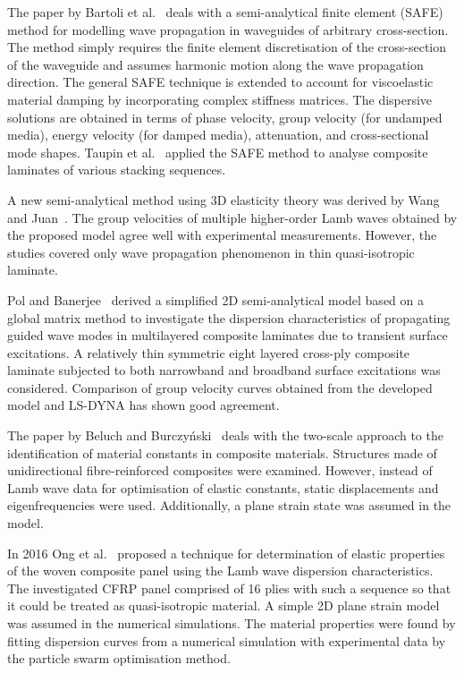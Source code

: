 \documentclass[preprint,12pt]{elsarticle}
\begin{document}
	The paper by Bartoli et al.~\cite{Bartoli2006} deals with a semi-analytical finite element (SAFE) method for modelling wave propagation in waveguides of arbitrary cross-section. The method simply requires the finite element discretisation of the cross-section of the waveguide and assumes harmonic motion along the wave propagation direction. The general SAFE technique is extended to account for viscoelastic material damping by incorporating complex stiffness matrices. The dispersive solutions are obtained in terms of phase velocity, group velocity (for undamped media), energy velocity (for damped media), attenuation, and cross-sectional mode shapes. Taupin et al.~\cite{Taupin2011} applied the SAFE method to analyse composite laminates of various stacking sequences.
	
	A new semi-analytical method using 3D elasticity theory was derived by Wang and Juan~\cite{Wang2007}. The group velocities of multiple higher-order Lamb waves obtained by the proposed model agree well with experimental measurements. However, the studies covered only wave propagation phenomenon in thin quasi-isotropic laminate. 
	
	Pol and Banerjee~\cite{Pol2013} derived a simplified 2D semi-analytical model based on a global matrix method to investigate the dispersion characteristics of propagating guided wave modes in multilayered composite laminates due to transient surface excitations. A relatively thin symmetric eight layered cross-ply composite laminate subjected to both narrowband and broadband surface excitations was considered. Comparison of group velocity curves obtained from the developed model and LS-DYNA has shown good agreement.
	
	The paper by Beluch and Burczyński~\cite{Beluch2014} deals with the two-scale approach to the identification of material constants in composite materials. Structures made of unidirectional fibre-reinforced composites were examined. However, instead of Lamb wave data for optimisation of elastic constants, static displacements and eigenfrequencies were used. Additionally, a plane strain state was assumed in the model.
	
	In 2016 Ong et al.~\cite{Ong2016} proposed a technique for determination of elastic properties of the woven composite panel using the Lamb wave dispersion characteristics. The investigated CFRP panel comprised of 16 plies with such a sequence so that it could be treated as quasi-isotropic material. A simple 2D plane strain model was assumed in the numerical simulations. The material properties were found by fitting dispersion curves from a numerical simulation with experimental data by the particle swarm optimisation method. 
	
\end{document}
